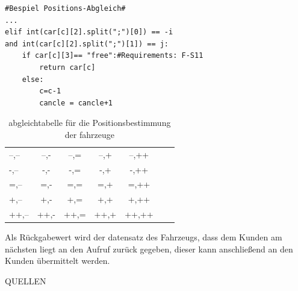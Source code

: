 \documentclass[conference]{IEEEtran}
\begin{document}
\begin{lstlisting}
#Bespiel Positions-Abgleich#
...
elif int(car[c][2].split(";")[0]) == -i 
and int(car[c][2].split(";")[1]) == j:
	if car[c][3]== "free":#Requirements: F-S11
    	return car[c]
    else:
        c=c-1
       	cancle = cancle+1
\end{lstlisting}
\begin{table}[h]
\centering
\label{tab.1}
\caption{abgleichtabelle für die Positionsbestimmung der fahrzeuge}
\begin{tabular}{lcccccr}
--,--&--,-&--,=&--,+&--,++\\
-,--&-,-&-,=&-,+&-,++\\
=,--&=,-&=,=&=,+&=,++\\
+,--&+,-&+,=&+,+&+,++\\
++,--&++,-&++,=&++,+&++,++\\
\end{tabular}
\end{table}
Als Rückgabewert wird der datensatz des Fahrzeugs, dass dem Kunden am nächsten liegt an den Aufruf zurück gegeben, dieser kann anschließend an den Kunden übermittelt werden. 
\begin{thebibliography}{00}
 QUELLEN  
\end{thebibliography}
\vspace{12pt}
\end{document}
